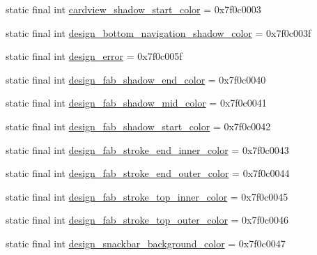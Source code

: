 \begin{CompactItemize}
\item 
static final int \hyperlink{classandroid_1_1support_1_1graphics_1_1drawable_1_1animated_1_1_r_1_1color_f43db1769153cff1dcdbd2210afa2d4b}{cardview\_\-shadow\_\-start\_\-color} = 0x7f0c0003
\item 
static final int \hyperlink{classandroid_1_1support_1_1graphics_1_1drawable_1_1animated_1_1_r_1_1color_47e78542edd4d2acd8af9c5a1bb9726f}{design\_\-bottom\_\-navigation\_\-shadow\_\-color} = 0x7f0c003f
\item 
static final int \hyperlink{classandroid_1_1support_1_1graphics_1_1drawable_1_1animated_1_1_r_1_1color_7803e3c4ae061a0af81e9587f35b81b6}{design\_\-error} = 0x7f0c005f
\item 
static final int \hyperlink{classandroid_1_1support_1_1graphics_1_1drawable_1_1animated_1_1_r_1_1color_d1d91fca2accc9fe1cc36f45fc355475}{design\_\-fab\_\-shadow\_\-end\_\-color} = 0x7f0c0040
\item 
static final int \hyperlink{classandroid_1_1support_1_1graphics_1_1drawable_1_1animated_1_1_r_1_1color_3352ef7665a6135649557243e8730cd5}{design\_\-fab\_\-shadow\_\-mid\_\-color} = 0x7f0c0041
\item 
static final int \hyperlink{classandroid_1_1support_1_1graphics_1_1drawable_1_1animated_1_1_r_1_1color_936040f4a9af0fac8c87cb14ddffa41d}{design\_\-fab\_\-shadow\_\-start\_\-color} = 0x7f0c0042
\item 
static final int \hyperlink{classandroid_1_1support_1_1graphics_1_1drawable_1_1animated_1_1_r_1_1color_83dc0314d4c76e813c78354ff2f13b90}{design\_\-fab\_\-stroke\_\-end\_\-inner\_\-color} = 0x7f0c0043
\item 
static final int \hyperlink{classandroid_1_1support_1_1graphics_1_1drawable_1_1animated_1_1_r_1_1color_47bead2c90f8a3b1c68d1e1f60867e1c}{design\_\-fab\_\-stroke\_\-end\_\-outer\_\-color} = 0x7f0c0044
\item 
static final int \hyperlink{classandroid_1_1support_1_1graphics_1_1drawable_1_1animated_1_1_r_1_1color_80a9bbe5904c9ccec62ae3813a928473}{design\_\-fab\_\-stroke\_\-top\_\-inner\_\-color} = 0x7f0c0045
\item 
static final int \hyperlink{classandroid_1_1support_1_1graphics_1_1drawable_1_1animated_1_1_r_1_1color_e049dd44a9a8389b2320a35d8cb4a975}{design\_\-fab\_\-stroke\_\-top\_\-outer\_\-color} = 0x7f0c0046
\item 
static final int \hyperlink{classandroid_1_1support_1_1graphics_1_1drawable_1_1animated_1_1_r_1_1color_52229dec410a525c8c74cd0bd780af4e}{design\_\-snackbar\_\-background\_\-color} = 0x7f0c0047

\end{CompactItemize}
